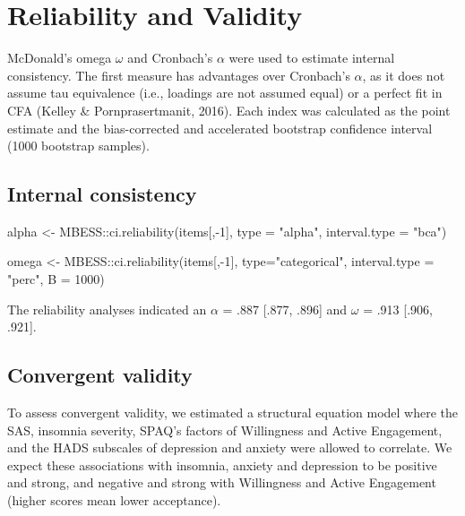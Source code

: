 \documentclass[
  letterpaper,
  DIV=11,
  numbers=noendperiod]{scrreprt}
\newenvironment{Shaded}{\begin{snugshade}}{\end{snugshade}}
\newcommand{\AttributeTok}[1]{\textcolor[rgb]{0.40,0.45,0.13}{#1}}
\newcommand{\DecValTok}[1]{\textcolor[rgb]{0.68,0.00,0.00}{#1}}
\newcommand{\FunctionTok}[1]{\textcolor[rgb]{0.28,0.35,0.67}{#1}}
\newcommand{\NormalTok}[1]{\textcolor[rgb]{0.00,0.23,0.31}{#1}}
\newcommand{\OtherTok}[1]{\textcolor[rgb]{0.00,0.23,0.31}{#1}}
\newcommand{\SpecialCharTok}[1]{\textcolor[rgb]{0.37,0.37,0.37}{#1}}
\newcommand{\StringTok}[1]{\textcolor[rgb]{0.13,0.47,0.30}{#1}}
\begin{document}

\hypertarget{reliability-and-validity}{%
\chapter{Reliability and Validity}\label{reliability-and-validity}}

McDonald's omega \(\omega\) and Cronbach's \(\alpha\) were used to
estimate internal consistency. The first measure has advantages over
Cronbach's \(\alpha\), as it does not assume tau equivalence (i.e.,
loadings are not assumed equal) or a perfect fit in CFA (Kelley \&
Pornprasertmanit, 2016). Each index was calculated as the point estimate
and the bias-corrected and accelerated bootstrap confidence interval
(1000 bootstrap samples).

\hypertarget{internal-consistency}{%
\section{Internal consistency}\label{internal-consistency}}

\begin{Shaded}
\begin{Highlighting}[]
\NormalTok{alpha }\OtherTok{\textless{}{-}}\NormalTok{ MBESS}\SpecialCharTok{::}\FunctionTok{ci.reliability}\NormalTok{(items[,}\SpecialCharTok{{-}}\DecValTok{1}\NormalTok{], }\AttributeTok{type =} \StringTok{"alpha"}\NormalTok{, }\AttributeTok{interval.type =} \StringTok{"bca"}\NormalTok{)}

\NormalTok{omega }\OtherTok{\textless{}{-}}\NormalTok{ MBESS}\SpecialCharTok{::}\FunctionTok{ci.reliability}\NormalTok{(items[,}\SpecialCharTok{{-}}\DecValTok{1}\NormalTok{], }\AttributeTok{type=}\StringTok{"categorical"}\NormalTok{, }\AttributeTok{interval.type =} \StringTok{"perc"}\NormalTok{, }\AttributeTok{B =} \DecValTok{1000}\NormalTok{)}
\end{Highlighting}
\end{Shaded}

The reliability analyses indicated an \(\alpha\) = .887 {[}.877, .896{]}
and \(\omega\) = .913 {[}.906, .921{]}.

\hypertarget{convergent-validity}{%
\section{Convergent validity}\label{convergent-validity}}

To assess convergent validity, we estimated a structural equation model
where the SAS, insomnia severity, SPAQ's factors of Willingness and
Active Engagement, and the HADS subscales of depression and anxiety were
allowed to correlate. We expect these associations with insomnia,
anxiety and depression to be positive and strong, and negative and
strong with Willingness and Active Engagement (higher scores mean lower
acceptance).
\end{document}
